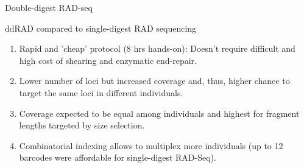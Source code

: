 \documentclass[presentation]{beamer}
\begin{document}
\begin{frame}[label=sec-2-2-1]{Double-digest RAD-seq \citep{Peterson2012}}
\begin{center}
\begin{figure}[htb]
{
}
\end{figure}
\end{center}
\end{frame}


\begin{frame}[label=sec-2-2-2]{ddRAD compared to single-digest RAD sequencing}
\begin{enumerate}
\item <1> Rapid and 'cheap' protocol (8 hrs hands-on): Doesn't require
difficult and high cost of shearing and enzymatic end-repair.
\item <2> Lower number of loci but increased coverage and, thus, higher
chance to target the same loci in different individuals.
\item <3> Coverage expected to be equal among individuals and highest for
fragment lengths targeted by size selection.
\item <4> Combinatorial indexing allows to multiplex more individuals (up to
12 barcodes were affordable for single-digest RAD-Seq).
\end{enumerate}
\end{frame}
\end{document}
